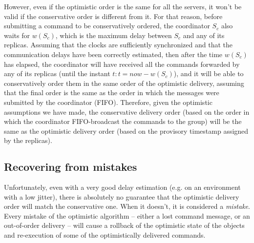 \documentclass[times, 10pt]{article}
\begin{document}
However, even if the optimistic order is the same for all the servers, it won't be valid if the conservative order is different from it. For that reason, before submitting a command to be conservatively ordered, the coordinator $S_c$ also waits for $w(S_c)$, which is the maximum delay between $S_c$ and any of its replicas. Assuming that the clocks are sufficiently synchronized and that the communication delays have been correctly estimated, then after the time $w(S_c)$ has elapsed, the coordinator will have received all the commands forwarded by any of its replicas (until the instant $t:t=now-w(S_c)$), and it will be able to conservatively order them in the same order of the optimistic delivery, assuming that the final order is the same as the order in which the messages were submitted by the coordinator (FIFO). Therefore, given the optimistic assumptions we have made, the conservative delivery order (based on the order in which the coordinator FIFO-broadcast the commands to the group) will be the same as the optimistic delivery order (based on the provisory timestamp assigned by the replicas).

\subsection{Recovering from mistakes}

Unfortunately, even with a very good delay estimation (e.g. on an environment with a low jitter), there is absolutely no guarantee that the optimistic delivery order will match the conservative one. When it doesn't, it is considered a \emph{mistake}. Every mistake of the optimistic algorithm -- either a lost command message, or an out-of-order delivery -- will cause a rollback of the optimistic state of the objects and re-execution of some of the optimistically delivered commands.
\end{document}
